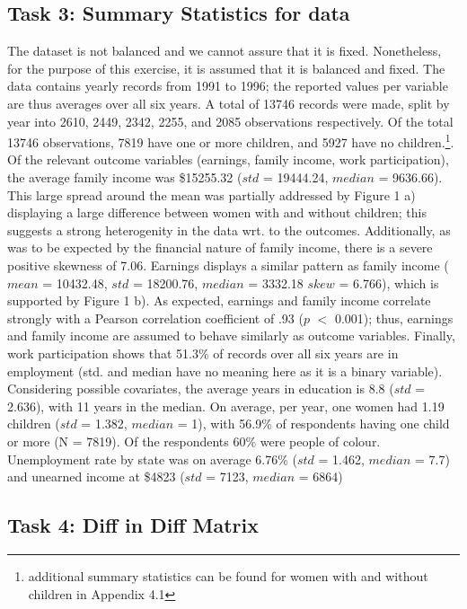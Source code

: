 \documentclass[a4paper]{article}
\begin{document}
\subsection{Task 3: Summary Statistics for data}
The dataset is not balanced and we cannot assure that it is fixed. Nonetheless, for the purpose of this exercise, it is assumed that it is balanced and fixed. The data contains yearly records from 1991 to 1996; the reported values per variable are thus averages over all six years. A total of 13746 records were made, split by year into 2610, 2449, 2342, 2255, and 2085 observations respectively. Of the total 13746 observations, 7819 have one or more children, and 5927 have no children.\footnote{additional summary statistics can be found for women with and without children in Appendix 4.1}. Of the relevant outcome variables (earnings, family income, work participation), the average family income was \$15255.32 ($std$ = 19444.24, $median$ = 9636.66). This large spread around the mean was partially addressed by Figure 1 a) displaying a large difference between women with and without children; this suggests a strong heterogenity in the data wrt. to the outcomes. Additionally, as was to be expected by the financial nature of family income, there is a severe positive skewness of 7.06. Earnings displays a similar pattern as family income ($mean$ = 10432.48, $std$ = 18200.76, $median$ = 3332.18 $skew$ = 6.766), which is supported by Figure 1 b). As expected, earnings and family income correlate strongly with a Pearson correlation coefficient of .93 ($p$ $<$ 0.001); thus, earnings and family income are assumed to behave similarly as outcome variables. Finally, work participation shows that 51.3\% of records over all six years are in employment (std. and median have no meaning here as it is a binary variable). Considering possible covariates, the average years in education is 8.8 ($std$ = 2.636), with 11 years in the median. On average, per year, one women had 1.19 children ($std$ = 1.382, $median$ = 1), with 56.9\% of respondents having one child or more (N = 7819). Of the respondents 60\% were people of colour. Unemployment rate by state was on average 6.76\% ($std$ = 1.462, $median$ = 7.7) and unearned income at \$4823 ($std$ = 7123, $median$ = 6864)

\subsection{Task 4: Diff in Diff Matrix}
\end{document}
